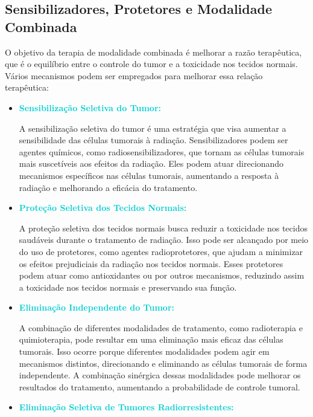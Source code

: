 \documentclass[11pt,a4paper]{article}
\begin{document}
\subsection*{Sensibilizadores, Protetores e Modalidade Combinada}

	O objetivo da terapia de modalidade combinada é melhorar a razão terapêutica, que é o equilíbrio entre o controle do tumor e a toxicidade nos tecidos normais. Vários mecanismos podem ser empregados para melhorar essa relação terapêutica:

	\begin{itemize}[label=\textcolor{CarnationPink}{$\blacktriangleright$}]
		\item \textcolor{DarkTurquoise}{\textbf{Sensibilização Seletiva do Tumor:}} 
		
		A sensibilização seletiva do tumor é uma estratégia que visa aumentar a sensibilidade das células tumorais à radiação. Sensibilizadores podem ser agentes químicos, como radiosensibilizadores, que tornam as células tumorais mais suscetíveis aos efeitos da radiação. Eles podem atuar direcionando mecanismos específicos nas células tumorais, aumentando a resposta à radiação e melhorando a eficácia do tratamento.

		\item \textcolor{DarkTurquoise}{\textbf{Proteção Seletiva dos Tecidos Normais:}} 
		
		A proteção seletiva dos tecidos normais busca reduzir a toxicidade nos tecidos saudáveis durante o tratamento de radiação. Isso pode ser alcançado por meio do uso de protetores, como agentes radioprotetores, que ajudam a minimizar os efeitos prejudiciais da radiação nos tecidos normais. Esses protetores podem atuar como antioxidantes ou por outros mecanismos, reduzindo assim a toxicidade nos tecidos normais e preservando sua função.

		\item \textcolor{DarkTurquoise}{\textbf{Eliminação Independente do Tumor:}}
		
		A combinação de diferentes modalidades de tratamento, como radioterapia e quimioterapia, pode resultar em uma eliminação mais eficaz das células tumorais. Isso ocorre porque diferentes modalidades podem agir em mecanismos distintos, direcionando e eliminando as células tumorais de forma independente. A combinação sinérgica dessas modalidades pode melhorar os resultados do tratamento, aumentando a probabilidade de controle tumoral.

		\item \textcolor{DarkTurquoise}{\textbf{Eliminação Seletiva de Tumores Radiorresistentes:}}
		

\end{itemize}
\end{document}
